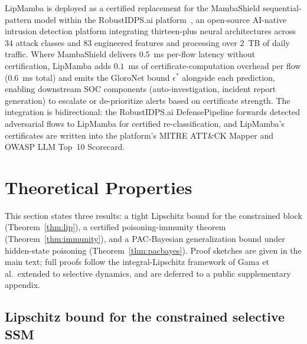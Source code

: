 \documentclass[journal,a4paper,10pt]{IEEEtran}
\theoremstyle{definition}
\theoremstyle{remark}
\newcommand{\modelname}{LipMamba}
\begin{document}
\modelname{} is deployed as a certified replacement for the MambaShield sequential-pattern model within the RobustIDPS.ai platform~\cite{anaedevha2026robustidps}, an open-source AI-native intrusion detection platform integrating thirteen-plus neural architectures across $34$ attack classes and $83$ engineered features and processing over $2$~TB of daily traffic. Where MambaShield delivers $0.5$~ms per-flow latency without certification, \modelname{} adds $0.1$~ms of certificate-computation overhead per flow ($0.6$~ms total) and emits the GloroNet bound $\epsilon^*$ alongside each prediction, enabling downstream SOC components (auto-investigation, incident report generation) to escalate or de-prioritize alerts based on certificate strength. The integration is bidirectional: the RobustIDPS.ai DefensePipeline forwards detected adversarial flows to \modelname{} for certified re-classification, and \modelname{}'s certificates are written into the platform's MITRE ATT\&CK Mapper and OWASP LLM Top~10 Scorecard.


\section{Theoretical Properties}
\label{sec:theory}

This section states three results: a tight Lipschitz bound for the constrained block (Theorem~\ref{thm:lip}), a certified poisoning-immunity theorem (Theorem~\ref{thm:immunity}), and a PAC-Bayesian generalization bound under hidden-state poisoning (Theorem~\ref{thm:pacbayes}). Proof sketches are given in the main text; full proofs follow the integral-Lipschitz framework of Gama et al.\ extended to selective dynamics, and are deferred to a public supplementary appendix.

\subsection{Lipschitz bound for the constrained selective SSM}
\end{document}
